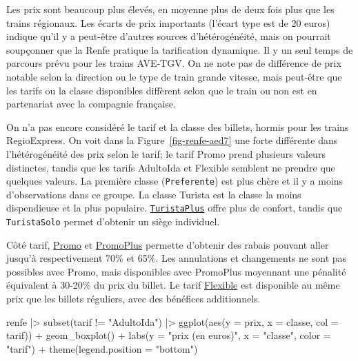 \documentclass[
  11pt,
  letterpaper,
]{scrbook}
\newenvironment{Shaded}{\begin{snugshade}}{\end{snugshade}}
\newcommand{\AttributeTok}[1]{\textcolor[rgb]{0.40,0.45,0.13}{#1}}
\newcommand{\FunctionTok}[1]{\textcolor[rgb]{0.28,0.35,0.67}{#1}}
\newcommand{\NormalTok}[1]{\textcolor[rgb]{0.00,0.23,0.31}{#1}}
\newcommand{\SpecialCharTok}[1]{\textcolor[rgb]{0.37,0.37,0.37}{#1}}
\newcommand{\StringTok}[1]{\textcolor[rgb]{0.13,0.47,0.30}{#1}}
\theoremstyle{definition}
\theoremstyle{remark}
\begin{document}
Les prix sont beaucoup plus élevés, en moyenne plus de deux fois plus
que les trains régionaux. Les écarts de prix importants (l'écart type
est de 20 euros) indique qu'il y a peut-être d'autres sources
d'hétérogénéité, mais on pourrait soupçonner que la Renfe pratique la
tarification dynamique. Il y un seul temps de parcours prévu pour les
trains AVE-TGV. On ne note pas de différence de prix notable selon la
direction ou le type de train grande vitesse, mais peut-être que les
tarifs ou la classe disponibles diffèrent selon que le train ou non est
en partenariat avec la compagnie française.

On n'a pas encore considéré le tarif et la classe des billets, hormis
pour les trains RegioExpress. On voit dans la
Figure~\ref{fig-renfe-aed7} une forte différente dans l'hétérogénéité
des prix selon le tarif; le tarif Promo prend plusieurs valeurs
distinctes, tandis que les tarifs AdultoIda et Flexible semblent ne
prendre que quelques valeurs. La première classe (\texttt{Preferente})
est plus chère et il y a moins d'observations dans ce groupe. La classe
Turista est la classe la moins dispendieuse et la plus populaire.
\href{http://web.archive.org/web/20161111134241/http://www.renfe.com/viajeros/tarifas/billete_promo.html}{\texttt{TuristaPlus}}
offre plus de confort, tandis que \texttt{TuristaSolo} permet d'obtenir
un siège individuel.

Côté tarif,
\href{http://web.archive.org/web/20161111134241/http://www.renfe.com/viajeros/tarifas/billete_promo.html}{Promo}
et
\href{http://web.archive.org/web/20161110220249/http://www.renfe.com/viajeros/tarifas/billete_promoplus.html}{PromoPlus}
permette d'obtenir des rabais pouvant aller jusqu'à respectivement 70\%
et 65\%. Les annulations et changements ne sont pas possibles avec
Promo, mais disponibles avec PromoPlus moyennant une pénalité équivalent
à 30-20\% du prix du billet. Le tarif
\href{http://web.archive.org/web/20161108192609/http://www.renfe.com/viajeros/tarifas/billete_flexible.html}{Flexible}
est disponible au même prix que les billets réguliers, avec des
bénéfices additionnels.

\begin{Shaded}
\begin{Highlighting}[]
\NormalTok{renfe }\SpecialCharTok{|\textgreater{}} 
  \FunctionTok{subset}\NormalTok{(tarif  }\SpecialCharTok{!=} \StringTok{"AdultoIda"}\NormalTok{) }\SpecialCharTok{|\textgreater{}}
  \FunctionTok{ggplot}\NormalTok{(}\FunctionTok{aes}\NormalTok{(}\AttributeTok{y =}\NormalTok{ prix, }
             \AttributeTok{x =}\NormalTok{ classe, }
             \AttributeTok{col =}\NormalTok{ tarif)) }\SpecialCharTok{+} 
    \FunctionTok{geom\_boxplot}\NormalTok{() }\SpecialCharTok{+} 
    \FunctionTok{labs}\NormalTok{(}\AttributeTok{y =} \StringTok{"prix (en euros)"}\NormalTok{,}
         \AttributeTok{x =} \StringTok{"classe"}\NormalTok{,}
         \AttributeTok{color =} \StringTok{"tarif"}\NormalTok{) }\SpecialCharTok{+}
    \FunctionTok{theme}\NormalTok{(}\AttributeTok{legend.position =} \StringTok{"bottom"}\NormalTok{)}
\end{Highlighting}
\end{Shaded}
\end{document}
